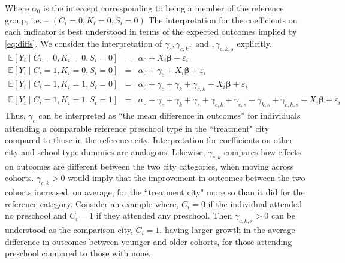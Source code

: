 \documentclass[11pt]{article}
\begin{document}
Where $\alpha_0$ is the intercept corresponding to being a member of the reference group, i.e. -- $(C_i = 0, K_i = 0, S_i = 0)$   The interpretation for the coefficients on each indicator is best understood in terms of the expected outcomes implied by \ref{eq:diffs}. We consider the interpretation of $\gamma_c, \gamma_{c,k}, \text{ and }, \gamma_{c,k,s}$ explicitly. 
\begin{eqnarray*}  
    \mathbb{E}[Y_i \mid C_i = 0, K_i = 0, S_i = 0] & = & \alpha_0 + X_i \boldsymbol{\beta} + \varepsilon_i \\
    \mathbb{E}[Y_i \mid C_i = 1, K_i = 0, S_i = 0] & = & \alpha_0 +  \gamma_c + X_i \boldsymbol{\beta} + \varepsilon_i \\
    \mathbb{E}[Y_i \mid C_i = 1, K_i = 1, S_i = 0] & = & \alpha_0 + \gamma_c + \gamma_k + \gamma_{c,k} + X_i \boldsymbol{\beta} + \varepsilon_i \\
    \mathbb{E}[Y_i \mid C_i = 1, K_i = 1, S_i = 1] & = & \alpha_0 + \gamma_c + \gamma_k + \gamma_s + \gamma_{c,k} + \gamma_{c,s} + \gamma_{k,s} + \gamma_{c,k,s} + X_i \boldsymbol{\beta} + \varepsilon_i
\end{eqnarray*}
Thus, $\gamma_c$ can be interpreted as ``the mean difference in outcomes'' for individuals attending a comparable reference preschool type in the ``treatment" city compared to those in the reference city.  Interpretation for coefficients on other city and school type dummies are analogous. Likewise, $\gamma_{c,k}$ compares how effects on outcomes are different between the two city categories, when moving across cohorts. $\gamma_{c,k} > 0$ would imply that the improvement in outcomes between the two cohorts increased, on average, for the ``treatment city" more so than it did for the reference category. Consider an example where, $C_i = 0$ if the individual attended no preschool and  $C_i = 1$ if they attended any preschool. Then $\gamma_{c,k,s} > 0$ can be understood as the comparison city, $C_i = 1$, having larger growth in the average difference in outcomes between younger and older cohorts, for those attending preschool compared to those with none.
\end{document}
